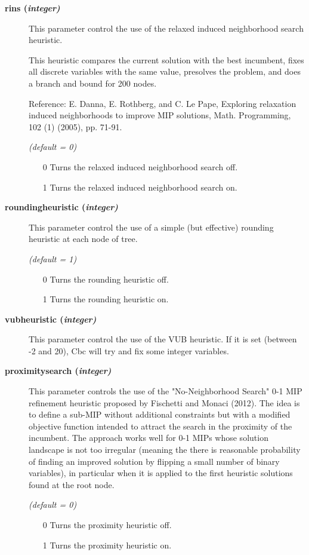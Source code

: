 \begin{description}
\item[\label{rins}\hypertarget{rins}
{\textbf{rins (\slshape{integer})}}]\hspace{1.0in}

This parameter control the use of the relaxed induced neighborhood search heuristic.

This heuristic compares the current solution with the best incumbent, fixes all discrete variables with the same value, presolves the problem, and does a branch and bound for 200 nodes.

Reference: E. Danna, E. Rothberg, and C. Le Pape, Exploring relaxation induced neighborhoods to improve MIP solutions, Math. Programming, 102 (1) (2005), pp. 71-91.

\textsl{(default = 0)}
\begin{itemize}
\item[0] 
Turns the relaxed induced neighborhood search off.
\item[1] 
Turns the relaxed induced neighborhood search on.
\end{itemize}

\item[\label{roundingheuristic}\hypertarget{roundingheuristic}
{\textbf{roundingheuristic (\slshape{integer})}}]\hspace{1.0in}

This parameter control the use of a simple (but effective) rounding heuristic at each node of tree.

\textsl{(default = 1)}
\begin{itemize}
\item[0]
Turns the rounding heuristic off.
\item[1]
Turns the rounding heuristic on.
\end{itemize}

\item[\label{vubheuristic}\hypertarget{vubheuristic}
{\textbf{vubheuristic (\slshape{integer})}}]\hspace{1.0in}

This parameter control the use of the VUB heuristic.
If it is set (between -2 and 20), Cbc will try and fix some integer variables.


\item[\label{proximitysearch}\hypertarget{proximitysearch}
{\textbf{proximitysearch (\slshape{integer})}}]\hspace{1.0in}

This parameter controls the use of the "No-Neighborhood Search" 0-1 MIP refinement heuristic proposed by Fischetti and Monaci (2012).
The idea is to define a sub-MIP without additional constraints but with a modified objective function intended to attract the search
in the proximity of the incumbent.
The approach works well for 0-1 MIPs whose solution landscape is not too irregular (meaning the there is reasonable probability of
finding an improved solution by flipping a small number of binary variables), in particular when it is applied to the first heuristic solutions
found at the root node.

\textsl{(default = 0)}
\begin{itemize}
\item[0]
Turns the proximity heuristic off.
\item[1]
Turns the proximity heuristic on.
\end{itemize}
\end{description}
